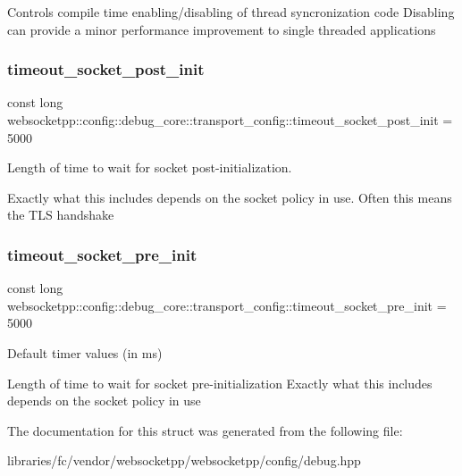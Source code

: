 Controls compile time enabling/disabling of thread syncronization code Disabling can provide a minor performance improvement to single threaded applications \mbox{\label{structwebsocketpp_1_1config_1_1debug__core_1_1transport__config_ad2a5a0b0dcc45899356e0ba7df49860d}} 
\subsubsection{\texorpdfstring{timeout\+\_\+socket\+\_\+post\+\_\+init}{timeout\_socket\_post\_init}}
{\footnotesize\ttfamily const long websocketpp\+::config\+::debug\+\_\+core\+::transport\+\_\+config\+::timeout\+\_\+socket\+\_\+post\+\_\+init = 5000\hspace{0.3cm}{\ttfamily [static]}}



Length of time to wait for socket post-\/initialization. 

Exactly what this includes depends on the socket policy in use. Often this means the T\+LS handshake \mbox{\label{structwebsocketpp_1_1config_1_1debug__core_1_1transport__config_a4935338debd7b6e1434a471c94d8abda}} 
\subsubsection{\texorpdfstring{timeout\+\_\+socket\+\_\+pre\+\_\+init}{timeout\_socket\_pre\_init}}
{\footnotesize\ttfamily const long websocketpp\+::config\+::debug\+\_\+core\+::transport\+\_\+config\+::timeout\+\_\+socket\+\_\+pre\+\_\+init = 5000\hspace{0.3cm}{\ttfamily [static]}}



Default timer values (in ms) 

Length of time to wait for socket pre-\/initialization Exactly what this includes depends on the socket policy in use 

The documentation for this struct was generated from the following file\+:\begin{DoxyCompactItemize}
\item 
libraries/fc/vendor/websocketpp/websocketpp/config/debug.\+hpp\end{DoxyCompactItemize}
